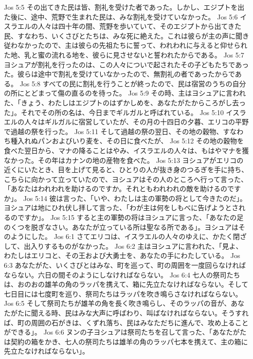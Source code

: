 Jos 5:5  その出てきた民は皆、割礼を受けた者であった。しかし、エジプトを出た後に、途中、荒野で生まれた民は、みな割礼を受けていなかった。
Jos 5:6  イスラエルの人々は四十年の間、荒野を歩いていて、そのエジプトから出てきた民、すなわち、いくさびとたちは、みな死に絶えた。これは彼らが主の声に聞き従わなかったので、主は彼らの先祖たちに誓って、われわれに与えると仰せられた地、乳と蜜の流れる地を、彼らに見させないと誓われたからである。
Jos 5:7  ヨシュアが割礼を行ったのは、この人々についで起されたその子どもたちであった。彼らは途中で割礼を受けていなかったので、無割礼の者であったからである。
Jos 5:8  すべての民に割礼を行うことが終ったので、民は宿営のうちの自分の所にとどまって傷の直るのを待った。
Jos 5:9  その時、主はヨシュアに言われた、「きょう、わたしはエジプトのはずかしめを、あなたがたからころがし去った」。それでその所の名は、今日までギルガルと呼ばれている。
Jos 5:10  イスラエルの人々はギルガルに宿営していたが、その月の十四日の夕暮、エリコの平野で過越の祭を行った。
Jos 5:11  そして過越の祭の翌日、その地の穀物、すなわち種入れぬパンおよびいり麦を、その日に食べたが、
Jos 5:12  その地の穀物を食べた翌日から、マナの降ることはやみ、イスラエルの人々は、もはやマナを獲なかった。その年はカナンの地の産物を食べた。
Jos 5:13  ヨシュアがエリコの近くにいたとき、目を上げて見ると、ひとりの人が抜き身のつるぎを手に持ち、こちらに向かって立っていたので、ヨシュアはその人のところへ行って言った、「あなたはわれわれを助けるのですか。それともわれわれの敵を助けるのですか」。
Jos 5:14  彼は言った、「いや、わたしは主の軍勢の将として今きたのだ」。ヨシュアは地にひれ伏し拝して言った、「わが主は何をしもべに告げようとされるのですか」。
Jos 5:15  すると主の軍勢の将はヨシュアに言った、「あなたの足のくつを脱ぎなさい。あなたが立っている所は聖なる所である」。ヨシュアはそのようにした。
Jos 6:1  さてエリコは、イスラエルの人々のゆえに、かたく閉ざして、出入りするものがなかった。
Jos 6:2  主はヨシュアに言われた、「見よ、わたしはエリコと、その王および大勇士を、あなたの手にわたしている。
Jos 6:3  あなたがた、いくさびとはみな、町を巡って、町の周囲を一度回らなければならない。六日の間そのようにしなければならない。
Jos 6:4  七人の祭司たちは、おのおの雄羊の角のラッパを携えて、箱に先立たなければならない。そして七日目には七度町を巡り、祭司たちはラッパを吹き鳴らさなければならない。
Jos 6:5  そして祭司たちが雄羊の角を長く吹き鳴らし、そのラッパの音が、あなたがたに聞える時、民はみな大声に呼ばわり、叫ばなければならない。そうすれば、町の周囲の石がきは、くずれ落ち、民はみなただちに進んで、攻め上ることができる」。
Jos 6:6  ヌンの子ヨシュアは祭司たちを召して言った、「あなたがたは契約の箱をかき、七人の祭司たちは雄羊の角のラッパ七本を携えて、主の箱に先立たなければならない」。
